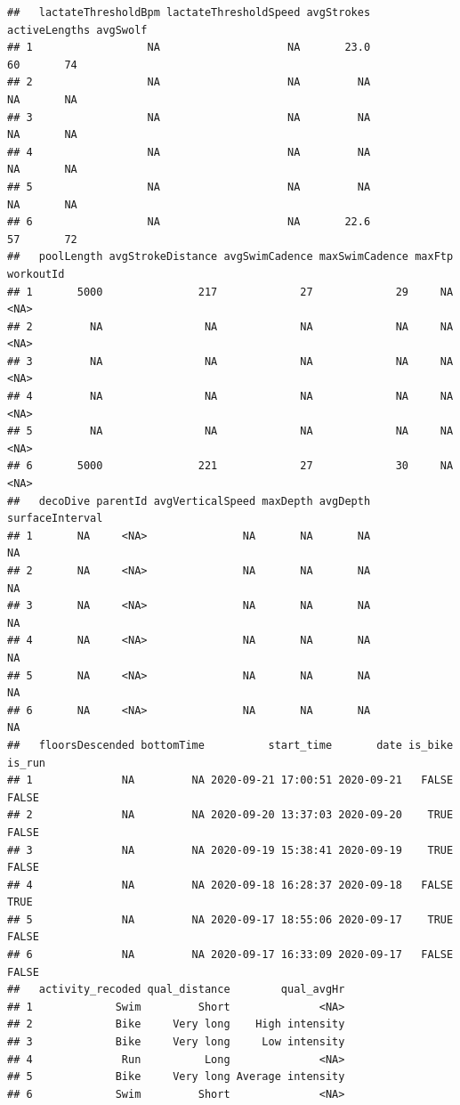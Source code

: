 \documentclass[
]{book}
\begin{document}
\begin{verbatim}
##   lactateThresholdBpm lactateThresholdSpeed avgStrokes activeLengths avgSwolf
## 1                  NA                    NA       23.0            60       74
## 2                  NA                    NA         NA            NA       NA
## 3                  NA                    NA         NA            NA       NA
## 4                  NA                    NA         NA            NA       NA
## 5                  NA                    NA         NA            NA       NA
## 6                  NA                    NA       22.6            57       72
##   poolLength avgStrokeDistance avgSwimCadence maxSwimCadence maxFtp workoutId
## 1       5000               217             27             29     NA      <NA>
## 2         NA                NA             NA             NA     NA      <NA>
## 3         NA                NA             NA             NA     NA      <NA>
## 4         NA                NA             NA             NA     NA      <NA>
## 5         NA                NA             NA             NA     NA      <NA>
## 6       5000               221             27             30     NA      <NA>
##   decoDive parentId avgVerticalSpeed maxDepth avgDepth surfaceInterval
## 1       NA     <NA>               NA       NA       NA              NA
## 2       NA     <NA>               NA       NA       NA              NA
## 3       NA     <NA>               NA       NA       NA              NA
## 4       NA     <NA>               NA       NA       NA              NA
## 5       NA     <NA>               NA       NA       NA              NA
## 6       NA     <NA>               NA       NA       NA              NA
##   floorsDescended bottomTime          start_time       date is_bike is_run
## 1              NA         NA 2020-09-21 17:00:51 2020-09-21   FALSE  FALSE
## 2              NA         NA 2020-09-20 13:37:03 2020-09-20    TRUE  FALSE
## 3              NA         NA 2020-09-19 15:38:41 2020-09-19    TRUE  FALSE
## 4              NA         NA 2020-09-18 16:28:37 2020-09-18   FALSE   TRUE
## 5              NA         NA 2020-09-17 18:55:06 2020-09-17    TRUE  FALSE
## 6              NA         NA 2020-09-17 16:33:09 2020-09-17   FALSE  FALSE
##   activity_recoded qual_distance        qual_avgHr
## 1             Swim         Short              <NA>
## 2             Bike     Very long    High intensity
## 3             Bike     Very long     Low intensity
## 4              Run          Long              <NA>
## 5             Bike     Very long Average intensity
## 6             Swim         Short              <NA>
\end{verbatim}
\end{document}
